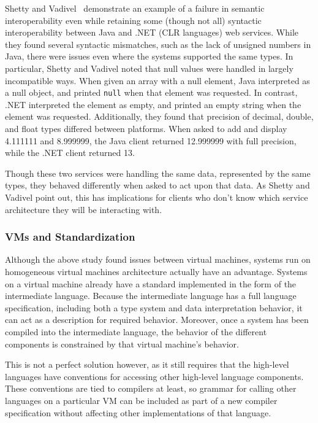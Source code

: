 \documentclass{sig-alternate}
\begin{document}
Shetty and Vadivel~\cite{Shetty:2009} demonstrate an example of a failure in semantic interoperability even while retaining some (though not all) syntactic interoperability between Java and .NET (CLR languages) web services.
While they found several syntactic mismatches, such as the lack of unsigned numbers in Java, there were issues even where the systems supported the same types. In particular, Shetty and Vadivel noted that null values were handled in largely incompatible ways. When given an array with a null element, Java interpreted as a null object, and printed {\tt null} when that element was requested. In contrast, .NET interpreted the element as empty, and printed an empty string when the element was requested. 
Additionally, they found that precision of decimal, double, and float types differed between platforms. When asked to add and display 4.111111 and 8.999999, the Java client returned 12.999999 with full precision, while the .NET client returned 13.

Though these two services were handling the same data, represented by the same types, they behaved differently \linebreak
 when asked to act upon that data. As Shetty and Vadivel point out, this has implications for clients who don't know which service architecture they will be interacting with\cite{Shetty:2009}.


\subsubsection*{VMs and Standardization}
Although the above study found issues between virtual machines, systems run on homogeneous virtual machines architecture actually have an advantage. Systems on a virtual machine already have a standard implemented in the form of the intermediate language. Because the intermediate language has a full language specification, including both a type system and data interpretation behavior, it can act as a description for required behavior. Moreover, once a system has been compiled into the intermediate language, the behavior of the different components is constrained by that virtual machine's behavior.

This is not a perfect solution however, as it still requires that the high-level languages have conventions for accessing other high-level language components.
These conventions are tied to compilers at least, so grammar for calling other languages on a particular VM can be included as part of a new compiler specification without affecting other implementations of that language.
\end{document}
